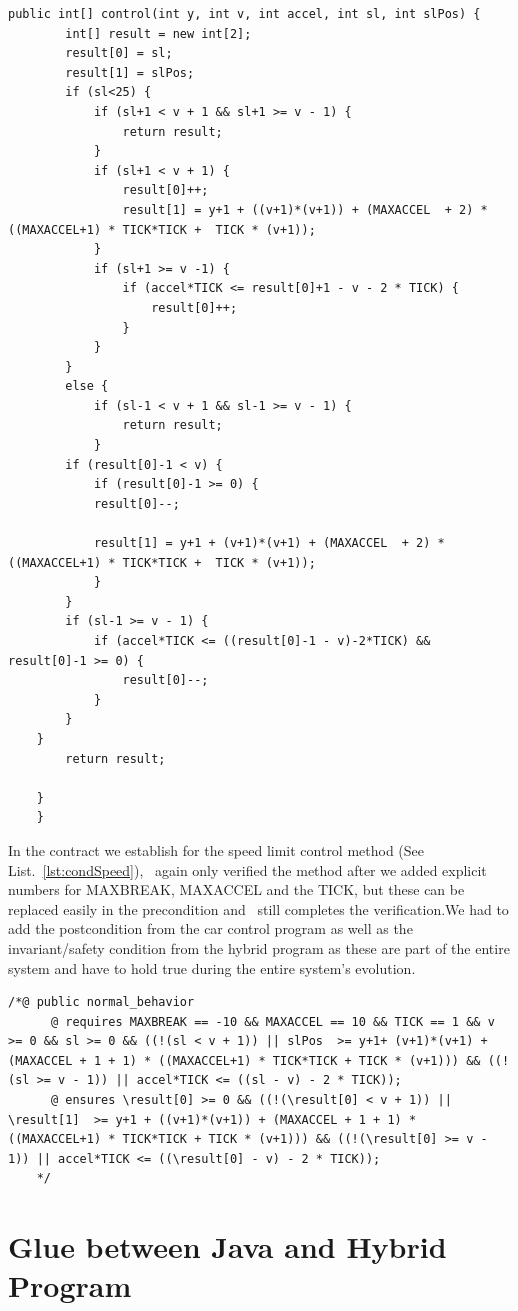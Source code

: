 \begin{lstlisting}[label=lst:programSpeed]
public int[] control(int y, int v, int accel, int sl, int slPos) {
		int[] result = new int[2];
		result[0] = sl;
		result[1] = slPos;
		if (sl<25) {
			if (sl+1 < v + 1 && sl+1 >= v - 1) {
				return result;
			}
			if (sl+1 < v + 1) {
				result[0]++;
				result[1] = y+1 + ((v+1)*(v+1)) + (MAXACCEL  + 2) * ((MAXACCEL+1) * TICK*TICK +  TICK * (v+1));
			}
			if (sl+1 >= v -1) {
				if (accel*TICK <= result[0]+1 - v - 2 * TICK) {
					result[0]++;
				}
			}
		}
		else {
			if (sl-1 < v + 1 && sl-1 >= v - 1) {
				return result;
			}
		if (result[0]-1 < v) {
			if (result[0]-1 >= 0) {
			result[0]--;
			
			result[1] = y+1 + (v+1)*(v+1) + (MAXACCEL  + 2) * ((MAXACCEL+1) * TICK*TICK +  TICK * (v+1));
			}
		}
		if (sl-1 >= v - 1) {
			if (accel*TICK <= ((result[0]-1 - v)-2*TICK) && result[0]-1 >= 0) {
				result[0]--;
			}
		}
	}
		return result;

	}
	}
\end{lstlisting}


In the contract we establish for the speed limit control method (See List.~\ref{lst:condSpeed}), \key~again only verified the method after we added explicit numbers for MAXBREAK, MAXACCEL and the TICK, but these can be replaced easily in the precondition and \key~still completes the verification.We had to add the postcondition from the car control program as well as the invariant/safety condition from the hybrid program as these are part of the entire system and have to hold true during the entire system's evolution.

\begin{lstlisting}[label=lst:condSpeed]
/*@ public normal_behavior
	  @ requires MAXBREAK == -10 && MAXACCEL == 10 && TICK == 1 && v >= 0 && sl >= 0 && ((!(sl < v + 1)) || slPos  >= y+1+ (v+1)*(v+1) + (MAXACCEL + 1 + 1) * ((MAXACCEL+1) * TICK*TICK + TICK * (v+1))) && ((!(sl >= v - 1)) || accel*TICK <= ((sl - v) - 2 * TICK));
	  @ ensures \result[0] >= 0 && ((!(\result[0] < v + 1)) || \result[1]  >= y+1 + ((v+1)*(v+1)) + (MAXACCEL + 1 + 1) * ((MAXACCEL+1) * TICK*TICK + TICK * (v+1))) && ((!(\result[0] >= v - 1)) || accel*TICK <= ((\result[0] - v) - 2 * TICK));
	*/
\end{lstlisting}

\section{Glue between Java and Hybrid Program}
\label{sec:traffic:glue}

